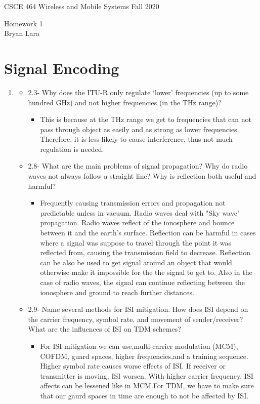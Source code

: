 \documentclass[11pt]{article}
\begin{document}
\newcommand{\answer}[1]{\mbox{~}}

{\large  CSCE 464 Wireless and Mobile Systems  \hfill Fall 2020\\
 \begin{center}
   Homework 1 \\
   Bryan Lara \\
    \end{center}
}

\section{Signal Encoding}
\begin{enumerate}[label=(\alph*)]
\item 
\begin{itemize}
  \item 2.3- Why does the ITU-R only regulate ‘lower’ frequencies (up to some hundred GHz)
and not higher frequencies (in the THz range)?
    \begin{itemize}
         \item  This is because at the THz  range we get to frequencies that can not pass through object as easily and as strong as lower frequencies. Therefore, it is less likely to cause interference, thus not much regulation is needed.
    \end{itemize}
  \item 2.8- What are the main problems of signal propagation? Why do radio waves not
always follow a straight line? Why is reflection both useful and harmful?
    \begin{itemize}
        \item Frequently causing transmission errors and propagation not predictable unless in vacuum.
        Radio waves deal with "Sky wave" propagation. Radio waves reflect of the ionosphere and bounce between it and the earth's surface. Reflection can be harmful in cases where a signal was suppose to travel through the point it was reflected from, causing the transmission field to decrease. Reflection can be also be used to get signal around an object that would otherwise make it impossible for the the signal to get to. Also in the case of radio waves, the signal can continue reflecting between the ionosphere and ground to reach further distances.
    \end{itemize}
  \item 2.9-  Name several methods for ISI mitigation. How does ISI depend on the carrier frequency, symbol rate, and movement of sender/receiver? What are the influences
of ISI on TDM schemes?
    \begin{itemize}
        \item For ISI mitigation we can use,multi-carrier modulation (MCM), COFDM, guard spaces, higher frequencies,and a training sequence. Higher symbol rate causes worse effects of ISI. If receiver or transmitter is moving, ISI worsen. With higher carrier frequency, ISI affects can be lessened like in MCM.For TDM, we have to make sure that our gaurd spaces in time are enough to not be affected by ISI.
        

\end{itemize}
\end{itemize}
\end{enumerate}
\end{document}
